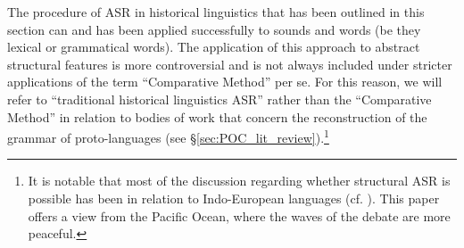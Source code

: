 \documentclass[12pt,letterpaper]{article}
\begin{document}
The procedure of ASR in historical linguistics that has been outlined in this section can and has been applied successfully to sounds and words (be they lexical or grammatical words). The application of this approach to abstract structural features is more controversial and is not always included under stricter applications of the term ``Comparative Method'' per se. For this reason, we will refer to ``traditional historical linguistics ASR'' rather than the ``Comparative Method'' in relation to bodies of work that concern the reconstruction of the grammar of proto-languages (see §\ref{sec:POC_lit_review}).\footnote{It is notable that most of the discussion regarding whether structural ASR is possible has been in relation to Indo-European languages (cf. \citealt{walkden_2013}). This paper offers a view from the Pacific Ocean, where the waves of the debate are more peaceful.}








\end{document}
